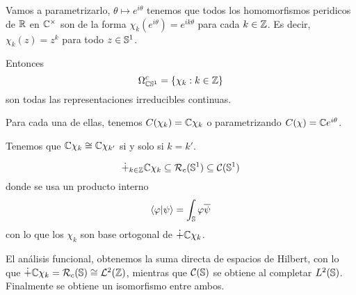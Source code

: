 Vamos a parametrizarlo, \(\theta\mapsto e^{i\theta}\) tenemos que
todos los homomorfismos peridicos de \(\mathbb{R}\) en \(\mathbb{C}^\times\)
son de la forma \(\chi_k(e^{i\theta})=e^{ik\theta}\) para cada \(k\in\mathbb{Z}\).
Es decir, \(\chi_k(z)=z^k\) para todo \(z\in\mathbb{S}^1\).

Entonces
\[
  \Omega^c_{\mathbb{C}\mathbb{S}^1}=\{\chi_k:k\in\mathbb{Z}\}
\]
son todas las representaciones irreducibles continuas.

Para cada una de ellas, tenemos \(C(\chi_k)=\mathbb{C}\chi_k\) o parametrizando
\(C(\chi)=\mathbb{C} e^{i\theta}\).

Tenemos que \(\mathbb{C}\chi_k\cong\mathbb{C}\chi_{k'}\) si y solo si \(k=k'\).

\[
  \dot{+}_{k\in\mathbb{Z}}\mathbb{C}\chi_k\subseteq\mathcal{R}_c(\mathbb{S}^1)
  \subseteq\mathcal{C}(\mathbb{S}^1)
\]
donde se usa un producto interno
\[
  \langle\varphi|\psi\rangle=\int_{\mathbb{S}}\varphi\overline{\psi}
\]
con lo que los \(\chi_k\) son base ortogonal de \(\dot{+}\mathbb{C} \chi_k\).

El análisis funcional, obtenemos la suma directa de espacios de Hilbert,
con lo que \(\dot{+}\mathbb{C} \chi_k=\mathcal{R}_c(\mathbb{S})\cong
\mathcal{L}^2(\mathbb{Z})\), mientras que \(\mathcal{C}(\mathbb{S})\)
se obtiene al completar \(L^2(\mathbb{S})\). Finalmente se obtiene un isomorfismo
entre ambos.


